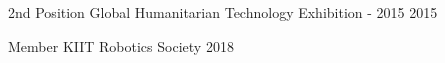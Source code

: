 
\begin{cvhonors}

  \cvhonor
    {2nd Position} %
    {Global Humanitarian Technology Exhibition - 2015} %
    {} %
    {2015} %

  \cvhonor
    {Member} %
    {KIIT Robotics Society} %
    {} %
    {2018} %



\end{cvhonors}
